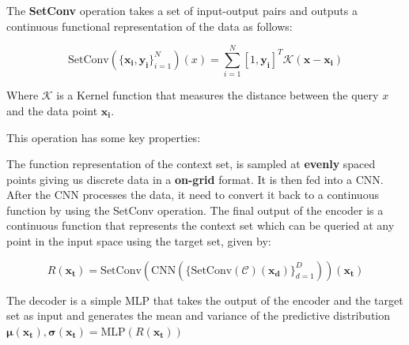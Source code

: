 \documentclass[../../main.tex]{subfiles}
\begin{document}
The \textbf{SetConv} operation takes a set of input-output pairs and outputs a continuous functional representation of the data as follows:

\begin{equation}
	\text{SetConv}(\{\bm{x_i}, \bm{y_i}\}_{i=1}^{N})(x) = \sum_{i=1}^{N} [1, \bm{y_i}] ^ T \mathcal{K}(\bm{x} - \bm{x_i})
\end{equation}

Where $\mathcal{K}$ is a Kernel function that measures the distance between the query $x$ and the data point $\bm{x_i}$.

This operation has some key properties:


The function representation of the context set, is sampled at \textbf{evenly} spaced points giving us discrete data in a \textbf{on-grid} format. It is then fed into a CNN. After the CNN processes the data, it need to convert it back to a continuous function by using the SetConv operation. The final output of the encoder is a continuous function that represents the context set which can be queried at any point in the input space using the target set, given by:

\begin{equation}
	R(\bm{x_t}) = \text{SetConv}(\text{CNN}(\{\text{SetConv}(\mathcal{C})(\bm{x_d})\}_{d=1}^{D}))(\bm{x_t})
\end{equation}

The decoder is a simple MLP that takes the output of the encoder and the target set as input and generates the mean and variance of the predictive distribution $\bm{\mu}(\bm{x_t}), \bm{\sigma}(\bm{x_t}) = \text{MLP}(R(\bm{x_t}))$


\ifSubfilesClassLoaded{%
    \printbibliography{}
}{} 
\end{document}
